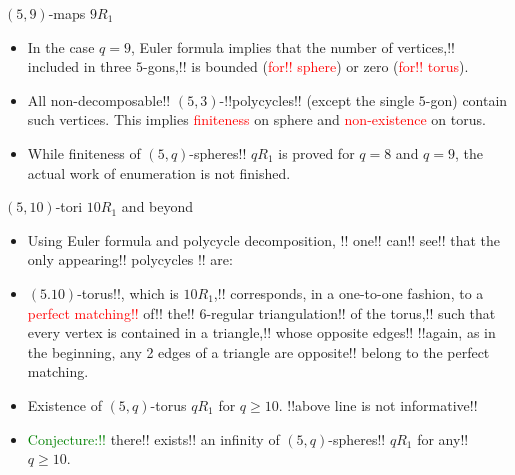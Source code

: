\documentclass[%
pdf,
colorBG,
slideColor,
]{prosper}
\begin{document}
\begin{slide}{$(5,9)$-maps $9R_1$}
\begin{itemize}
\item In the case $q=9$, Euler formula implies that the number of 
vertices,!! included in three $5$-gons,!! is bounded 
(\textcolor{red}{for!! sphere}) or zero (\textcolor{red}{for!! torus}).
\item All non-decomposable!! $(5,3)$-!!polycycles!! (except the single 
$5$-gon) contain such vertices. 
This implies \textcolor{red}{finiteness} on sphere and \textcolor{red}{non-existence} on torus.
\item While finiteness of $(5,q)$-spheres!! $qR_1$ is proved for $q=8$ and 
$q=9$, the actual work of enumeration is not finished.
\end{itemize}
\end{slide}




\begin{slide}{$(5,10)$-tori $10R_1$ and beyond}

\begin{itemize}
\item Using Euler formula and polycycle decomposition, 
!!%
one!! can!! see!! that the only appearing!! polycycles 
!!%
are:
\begin{center}
\begin{minipage}{3.4cm}
\centering
{}\par
\end{minipage}
\begin{minipage}{3.4cm}
\centering
{}\par
\end{minipage}
\end{center}
\item $(5.10)$-torus!!, which is $10R_1$,!! corresponds, in a one-to-one 
fashion, to a \textcolor{red}{perfect matching!!} of!! the!! $6$-regular 
triangulation!! of the torus,!! such that every vertex is contained in a 
triangle,!! whose opposite edges!! 
!!again, as in the beginning, any 2 edges of a triangle are opposite!!
belong to the perfect matching.
\item Existence of $(5,q)$-torus $qR_1$ for $q\geq 10$.
!!above line is not informative!!
\item \textcolor{green}{Conjecture:!!} there!! exists!! an infinity of 
$(5,q)$-spheres!! $qR_1$ for any!! $q\geq 10$.
\end{itemize}

\end{slide}
\end{document}
